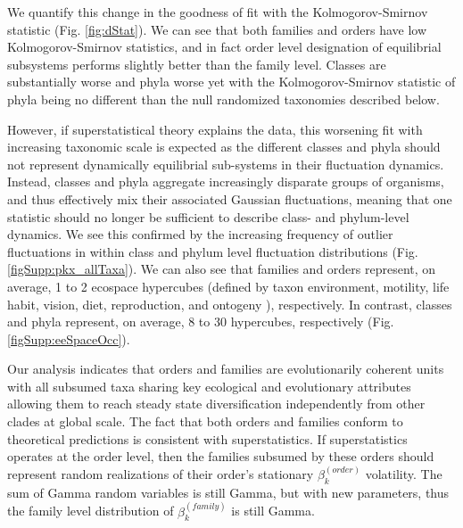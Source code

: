 \documentclass[12pt]{article}
\let\citep=\cite
\begin{document}
We quantify this change in the goodness of fit with the
Kolmogorov-Smirnov statistic (Fig. \ref{fig:dStat}). We can see that
both families and orders have low Kolmogorov-Smirnov statistics, and
in fact order level designation of equilibrial subsystems performs
slightly better than the family level. Classes are substantially worse
and phyla worse yet with the Kolmogorov-Smirnov statistic of phyla
being no different than the null randomized taxonomies described
below.

However, if superstatistical theory explains the data, this worsening
fit with increasing taxonomic scale is expected as the different
classes and phyla should not represent dynamically equilibrial
sub-systems in their fluctuation dynamics. Instead, classes and phyla
aggregate increasingly disparate groups of organisms, and thus
effectively mix their associated Gaussian fluctuations, meaning that
one statistic should no longer be sufficient to describe class- and
phylum-level dynamics. We see this confirmed by the increasing
frequency of outlier fluctuations in within class and phylum level
fluctuation distributions (Fig. \ref{figSupp:pkx_allTaxa}). We can
also see that families and orders represent, on average, 1 to 2
ecospace hypercubes (defined by taxon environment, motility, life
habit, vision, diet, reproduction, and ontogeny \citep{bambach1983,
  bambach2007, bush2007}), respectively. In contrast, classes and
phyla represent, on average, 8 to 30 hypercubes, respectively
(Fig. \ref{figSupp:eeSpaceOcc}).


Our analysis indicates that orders and families are evolutionarily
coherent units with all subsumed taxa sharing key ecological
and evolutionary attributes allowing them to reach steady state
diversification independently from other clades at global scale. The
fact that both orders and families conform to theoretical predictions
is consistent with superstatistics. If superstatistics operates at the
order level, then the families subsumed by these orders should
represent random realizations of their order's stationary $\beta_k^{(order)}$
volatility. The sum of Gamma random variables is still Gamma, but with
new parameters, thus the family level distribution of
$\beta_k^{(family)}$ is still Gamma.
\end{document}

